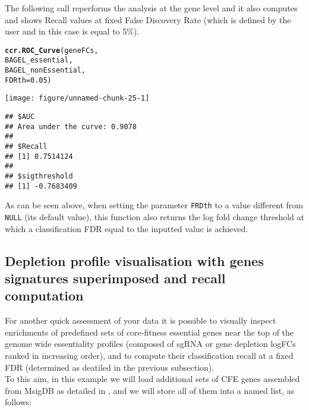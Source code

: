\documentclass{article}\usepackage[]{graphicx}\usepackage[]{color}
\makeatletter
\def\maxwidth{ %
  \ifdim\Gin@nat@width>\linewidth
    \linewidth
  \else
    \Gin@nat@width
  \fi
}
\newcommand{\hlnum}[1]{\textcolor[rgb]{0.686,0.059,0.569}{#1}}%
\newcommand{\hlstd}[1]{\textcolor[rgb]{0.345,0.345,0.345}{#1}}%
\newcommand{\hlkwc}[1]{\textcolor[rgb]{0.333,0.667,0.333}{#1}}%
\newcommand{\hlkwd}[1]{\textcolor[rgb]{0.737,0.353,0.396}{\textbf{#1}}}%
\newenvironment{kframe}{%
 \def\at@end@of@kframe{}%
 \ifinner\ifhmode%
  \def\at@end@of@kframe{\end{minipage}}%
  \begin{minipage}{\columnwidth}%
 \fi\fi%
 \def\FrameCommand##1{\hskip\@totalleftmargin \hskip-\fboxsep
 \colorbox{shadecolor}{##1}\hskip-\fboxsep
     \hskip-\linewidth \hskip-\@totalleftmargin \hskip\columnwidth}%
 \MakeFramed {\advance\hsize-\width
   \@totalleftmargin\z@ \linewidth\hsize
   \@setminipage}}%
 {\par\unskip\endMakeFramed%
 \at@end@of@kframe}
\newenvironment{knitrout}{}{} %
\makeatother
\begin{document}
The following call reperforms the analysis at the gene level and it also computes and shows Recall values at fixed False Discovery Rate (which is defined by the user and in this case is equal to 5\%).

\begin{knitrout}
\color{fgcolor}\begin{kframe}
\begin{alltt}
\hlkwd{ccr.ROC_Curve}\hlstd{(geneFCs,}
                         \hlstd{BAGEL_essential,}
                         \hlstd{BAGEL_nonEssential,}
                         \hlkwc{FDRth} \hlstd{=} \hlnum{0.05}\hlstd{)}
\end{alltt}
\end{kframe}
\texttt{[image: figure/unnamed-chunk-25-1]} 
\begin{kframe}\begin{verbatim}
## $AUC
## Area under the curve: 0.9078
## 
## $Recall
## [1] 0.7514124
## 
## $sigthreshold
## [1] -0.7683409
\end{verbatim}
\end{kframe}
\end{knitrout}
 
As can be seen above, when setting the parameter \texttt{FRDth} to a value different from \texttt{NULL}
(its default value), this function also returns the log fold change threshold at which a classification FDR equal to the inputted value is achieved. 
 
\subsection{Depletion profile visualisation with genes signatures superimposed and recall computation}
For another quick assessment of your data it is possible to visually inspect enrichments of predefined sets of core-fitness essential genes near the top of the genome wide essentiality profiles (composed of sgRNA or gene depletion logFCs ranked in increasing order), and to compute their classification recall at a fixed FDR (determined as deatiled in the previous subsection).\\
 
To this aim, in this example we will load additional sets of CFE genes assembled from MsigDB \cite{Subramanian:2005wu} as detailed in \cite{Iorio:2017}, and we will store all of them into a named list, as follows:
\end{document}
